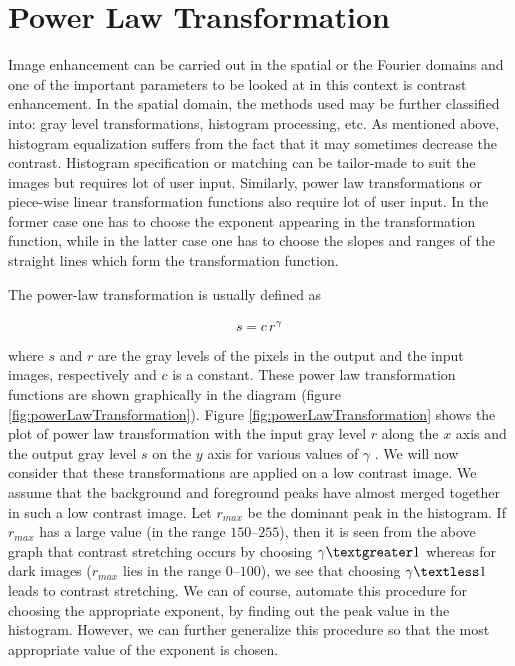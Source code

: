 \section{Power Law Transformation}
Image enhancement can be carried out in the spatial or the Fourier domains and one of the important
parameters to be looked at in this context is contrast enhancement\cite{pt1}. In the spatial domain,
the methods used may be further classified into: gray level transformations, histogram processing,
etc. As mentioned above, histogram equalization suffers from the fact that it may sometimes
decrease the contrast\cite{pt2}. Histogram specification or matching can be tailor-made to suit the images but requires lot of user input. Similarly, power law transformations or piece-wise linear transformation
functions also require lot of user input\cite{pt3}. In the former case one has to choose the exponent
appearing in the transformation function, while in the latter case one has to choose the slopes
and ranges of the straight lines which form the transformation function\cite{pt2}.

The power-law transformation is usually defined as

\begin{equation}
	s=c \thinspace r^\gamma
\end{equation}
where $s$ and $r$ are the gray levels of the pixels in the output and the input images, respectively and
$c$ is a constant. These power law transformation functions are shown graphically in the diagram
(figure \ref{fig:powerLawTransformation}).
Figure \ref{fig:powerLawTransformation} shows the plot of power law transformation with the input gray level $r$ along the $x$ axis and the output gray level $s$ on the $y$ axis for various values of $\gamma$ .
We will now consider that these transformations are applied on a low contrast image. We
assume that the background and foreground peaks have almost merged together in such a low
contrast image. Let $r_{max}$ be the dominant peak in the histogram\cite{he2}. If $r_{max}$ has a large value (in the
range $150\textrm{--}255$), then it is seen from the above graph that contrast stretching occurs by choosing
$\gamma \textgreater 1$ whereas for dark images ($r_{max}$ lies in the range $0\textrm{--}100$), we see that choosing $\gamma \textless 1$ leads
to contrast stretching. We can of course, automate this procedure for choosing the appropriate
exponent, by finding out the peak value in the histogram. However, we can further generalize
this procedure so that the most appropriate value of the exponent is chosen\cite{pt3}.

